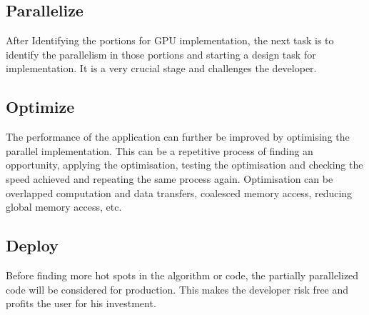 \subsection{Parallelize}
After Identifying the portions for GPU implementation, the next task is to identify the parallelism in those portions and starting a design task for implementation. It is a very crucial stage and challenges the developer.
\subsection{Optimize}
The performance of the application can further be improved by optimising the parallel implementation. This can be a repetitive process of finding an opportunity, applying the optimisation, testing the optimisation and checking the speed achieved and repeating the same process again. Optimisation can be overlapped computation and data transfers, coalesced memory access, reducing global memory access, etc.
\subsection{Deploy}
Before finding more hot spots in the algorithm or code, the partially parallelized code will be considered for production. This makes the developer risk free and profits the user for his investment.
